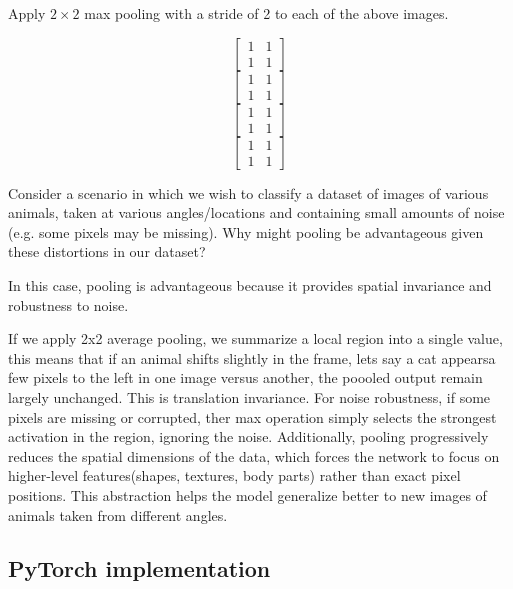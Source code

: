 \problem[3]

Apply $2 \times 2$ max pooling with a stride of 2 to each of the above images.

\begin{subsolution}
$$\begin{bmatrix} 1 & 1 \\ 1 & 1 \end{bmatrix}$$
$$\begin{bmatrix} 1 & 1 \\ 1 & 1 \end{bmatrix}$$
$$\begin{bmatrix} 1 & 1 \\ 1 & 1 \end{bmatrix}$$
$$\begin{bmatrix} 1 & 1 \\ 1 & 1 \end{bmatrix}$$
\end{subsolution}

\newpage


\problem[4]

Consider a scenario in which we wish to classify a dataset of images of various animals, taken at various angles/locations and containing small amounts of noise (e.g. some pixels may be missing). Why might pooling be advantageous given these distortions in our dataset?

\begin{subsolution}
In this case, pooling is advantageous because it provides spatial invariance and 
robustness to noise. 

If we apply 2x2 average pooling, we summarize a local region into a single value,
this means that if an animal shifts slightly in the frame, lets say a 
cat appearsa few pixels to the left in one image versus another, the poooled
output remain largely unchanged. This is translation invariance. 
For noise robustness, if some pixels are missing or corrupted,
ther max operation simply selects the strongest activation in the region,
ignoring the noise.
Additionally, pooling progressively reduces the spatial dimensions of the data,
which forces the network to focus on higher-level features(shapes, textures, body parts)
rather than exact pixel positions. This abstraction helps the model generalize better
to new images of animals taken from different angles. 
\end{subsolution}

\newpage


\subsection{PyTorch implementation}
\problem[20]

